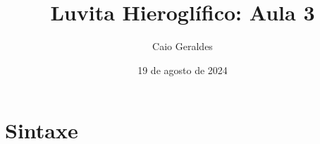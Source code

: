 \documentclass[article]{luvita}
\title{Luvita Hieroglífico: Aula 3}
\author{Caio Geraldes}
\date{19 de agosto de 2024}
\begin{document}
\frontmatter

\mainmatter%

\maketitle

\chapter{Sintaxe}



\backmatter%

\printbibliography%
\end{document}
